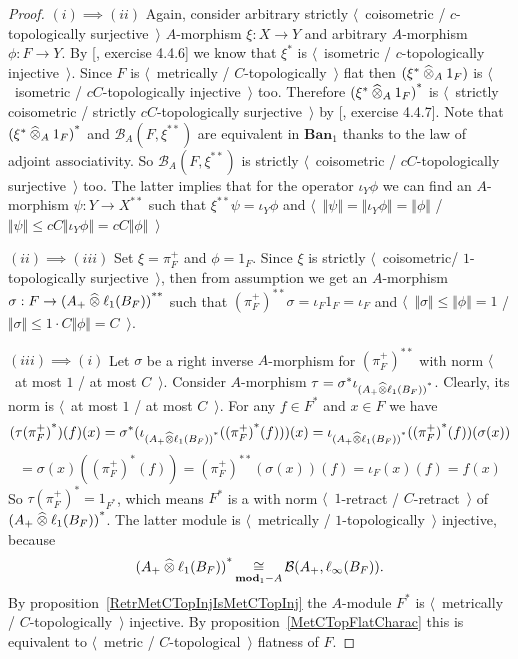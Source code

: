 \begin{proof} $(i)\implies (ii)$ Again, consider arbitrary strictly 
$\langle$~coisometric / $c$-topologically surjective~$\rangle$ $A$-morphism
$\xi:X\to Y$ and arbitrary $A$-morphism $\phi:F\to Y$. By
[\cite{HelLectAndExOnFuncAn}, exercise 4.4.6] we know that $\xi^*$ is
$\langle$~isometric / $c$-topologically injective~$\rangle$. Since $F$ is
$\langle$~metrically / $C$-topologically~$\rangle$ flat then
$(\xi^*\mathbin{\widehat{\otimes}}_{A}1_F)$ is $\langle$~isometric / $cC$-topologically
injective~$\rangle$ too. Therefore ${(\xi^*\mathbin{\widehat{\otimes}}_{A}1_F)}^*$ is
$\langle$~strictly coisometric / strictly $cC$-topologically
surjective~$\rangle$ by [\cite{HelLectAndExOnFuncAn}, exercise 4.4.7]. Note that
${(\xi^*\mathbin{\widehat{\otimes}}_{A}1_F)}^*$ and $\mathcal{B}_A(F,\xi^{**})$ are equivalent
in $\mathbf{Ban}_1$ thanks to the law of adjoint associativity. So
$\mathcal{B}_A(F,\xi^{**})$ is strictly $\langle$~coisometric / 
$cC$-topologically surjective~$\rangle$ too. The latter implies that for the
operator $\iota_Y\phi$ we can find an $A$-morphism $\psi:Y\to X^{**}$ such that
$\xi^{**}\psi=\iota_Y\phi$ and
$\langle$~$\Vert\psi\Vert=\Vert\iota_Y\phi\Vert=\Vert\phi\Vert$ /
$\Vert\psi\Vert\leq cC\Vert\iota_Y\phi\Vert=cC\Vert\phi\Vert$~$\rangle$

$(ii)\implies (iii)$ Set $\xi=\pi_F^+$ and $\phi=1_F$. Since $\xi$ is
strictly $\langle$~coisometric/ $1$-topologically surjective~$\rangle$,
then from assumption we get an $A$-morphism $\sigma:F\to
{(A_+\mathbin{\widehat{\otimes}}\ell_1(B_F))}^{**}$ such that 
${(\pi_F^+)}^{**}\sigma
=\iota_F 1_F
=\iota_F$ 
and $\langle$~$\Vert\sigma\Vert\leq \Vert\phi\Vert=1$ /
$\Vert\sigma\Vert\leq 1\cdot C\Vert\phi\Vert=C$~$\rangle$.

$(iii)\implies (i)$ Let $\sigma$ be a right inverse $A$-morphism for
${(\pi_F^+)}^{**}$ with norm $\langle$~at most $1$ / at most $C$~$\rangle$.
Consider $A$-morphism $\tau=\sigma^*\iota_{{(A_+\mathbin{\widehat{\otimes}}\ell_1(B_F))}^*}$.
Clearly, its norm is $\langle$~at most $1$ / at most $C$~$\rangle$. For any
$f\in F^*$ and $x\in F$ we have
$$
({\tau(\pi_F^+)}^*)(f)(x)
=\sigma^*(\iota_{{(A_+\mathbin{\widehat{\otimes}}\ell_1(B_F))}^*}({(\pi_F^+)}^*(f)))(x)
=\iota_{{(A_+\mathbin{\widehat{\otimes}}\ell_1(B_F))}^*}({(\pi_F^+)}^*(f))(\sigma(x))
$$
$$
=\sigma(x)({(\pi_F^+)}^*(f))
={(\pi_F^+)}^{**}(\sigma(x))(f)
=\iota_F(x)(f)
=f(x)
$$
So ${\tau(\pi_F^+)}^*=1_{F^*}$, which means $F^*$ is a with norm
$\langle$~$1$-retract / $C$-retract~$\rangle$ of
${(A_+\mathbin{\widehat{\otimes}}\ell_1(B_F))}^*$. The latter module is $\langle$~metrically /
$1$-topologically~$\rangle$ injective, because 
$$
{(A_+\mathbin{\widehat{\otimes}}\ell_1(B_F))}^*
\mathop{\mathbin{\cong}}\limits_{\mathbf{mod}_1-A}
\mathcal{B}(A_+,\ell_\infty(B_F)).
$$ 
By proposition~\ref{RetrMetCTopInjIsMetCTopInj} the $A$-module $F^*$ is
$\langle$~metrically / $C$-topologically~$\rangle$ injective. By 
proposition~\ref{MetCTopFlatCharac} this is
equivalent to $\langle$~metric / $C$-topological~$\rangle$ flatness of $F$.
\end{proof}

